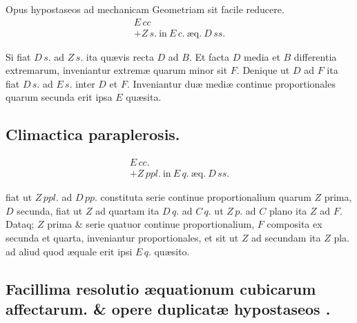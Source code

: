 \documentclass[11pt,a4paper]{article}
\begin{document}
Opus  hypostaseos ad mechanicam Geometriam sit facile reducere.
\[ \begin{array}{l} E\,cc \\ + Z\,s.\ \text{in}\ E\,c.\ \text{æq.}\ D\,ss. \end{array} \]

Si fiat $D\,s.$ ad $Z\,s.$ ita quævis recta $D$ ad $B$. Et facta $D$ media et $B$ differentia extremarum, inveniantur extremæ quarum minor sit $F$. Denique ut  $D$ ad $F$ ita fiat $D\,s.$ ad $E\,s.$  inter $D$ et $F$. Inveniantur duæ mediæ continue proportionales quarum secunda erit ipsa $E$ quæsita.

\subsection*{Climactica paraplerosis.}

\[ \begin{array}{l} E\,cc. \\ + Z\,ppl.\ \text{in}\ E\,q.\ \text{æq.}\ D\,ss. \end{array} \]

fiat ut $Z\,ppl.$ ad $D\,pp.$  constituta serie continue proportionalium quarum $Z$ prima, $D$ secunda, fiat ut $Z$ ad quartam ita $D\,q.$ ad $C\,q.$ \uncertain{\&} ut $Z\,p.$ ad $C$ plano ita $Z$ ad $F$. Dataq; $Z$ prima \& serie quatuor continue proportionalium, $F$ composita ex secunda et quarta, inveniantur proportionales, et sit ut $Z$ ad secundam ita $Z$ pla. ad aliud quod æquale erit ipsi $E\,q.$ quæsito.

\subsection*{Facillima resolutio æquationum cubicarum affectarum. \& opere duplicatæ hypostaseos .}
\end{document}
